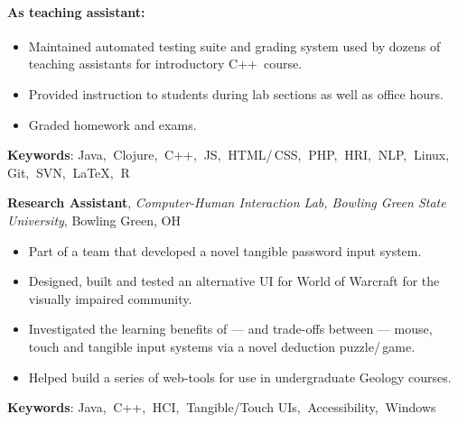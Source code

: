 \documentclass[10pt, letter]{article}
\newcommand{\years}[1]{\marginnote{\footnotesize #1}}
\newenvironment{desc*}{
  \begin{description}
    \setlength{\itemsep}{0.2pt}
    \setlength{\parskip}{-1pt}
    \setlength{\parsep}{0pt}
  }{
  \end{description}
}
\begin{document}
\paragraph{\textbf{As teaching assistant:}}
\begin{itemize}[leftmargin=*, parsep=-1pt]
\item Maintained automated testing suite and grading system used by dozens
of teaching assistants for introductory C++\, course.
\item Provided instruction to students during lab sections as well as office hours.
\item Graded homework and exams.
\end{itemize}
\vspace{-.2cm}
\begin{desc*}
\item[\rm \color{redblue} \textbf{Keywords}:] Java,$\:$ Clojure,$\:$ C++,$\:$
  JS,$\:$ HTML/\,CSS,$\:$ PHP,$\:$ HRI,$\:$ NLP,$\:$ Linux,$\:$ Git,$\:$ SVN,$\:$ \LaTeX,$\:$ R\\
\end{desc*}

\vspace{-.2cm}
\years{2010 - 2012}
\textbf{\fontsize{10.5pt}{1em}\selectfont Research Assistant}, 
\textit{Computer-Human Interaction Lab, Bowling Green State
  University}, Bowling Green, OH \\

\vspace{-.3cm}
\begin{itemize}[leftmargin=*, parsep=-1pt]
\item Part of a team that developed a novel tangible password input system.
\item Designed, built and tested an alternative UI for World of Warcraft for
  the visually impaired community. 
\item Investigated the learning benefits of --- and trade-offs between ---
  mouse, touch and tangible input systems via a novel deduction puzzle/\,game.
\item Helped build a series of web-tools for use in undergraduate Geology courses. 
\end{itemize}

\vspace{-.2cm}
\begin{desc*}
\item[\rm \color{redblue} \textbf{Keywords}:] Java,$\:$ C++,$\:$ HCI,$\:$ Tangible/Touch UIs,$\:$ Accessibility,$\:$ Windows\\
\end{desc*}
\end{document}
